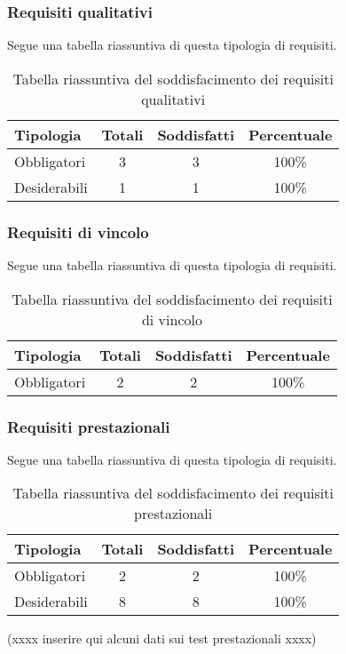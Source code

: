 \subsubsection{Requisiti qualitativi}
Segue una tabella riassuntiva di questa tipologia di requisiti.
\begin{table}[H]
	\begin{center}
	  \begin{tabular}{ l  c  c  c }
	    \hline
	    \textbf{Tipologia} & \textbf{Totali} & \textbf{Soddisfatti} & \textbf{Percentuale} \\ \hline
	    Obbligatori & 3 & 3 & 100\%\\ \hline
	    Desiderabili & 1 & 1 & 100\%\\
	    \hline
	  \end{tabular}
	\end{center}
	\caption{Tabella riassuntiva del soddisfacimento dei requisiti qualitativi}
\end{table}

\subsubsection{Requisiti di vincolo}
Segue una tabella riassuntiva di questa tipologia di requisiti.
\begin{table}[H]
	\begin{center}
	  \begin{tabular}{ l  c  c  c }
	    \hline
	    \textbf{Tipologia} & \textbf{Totali} & \textbf{Soddisfatti} & \textbf{Percentuale} \\ \hline
	    Obbligatori & 2 & 2 & 100\%\\
	    \hline
	  \end{tabular}
	\end{center}
\caption{Tabella riassuntiva del soddisfacimento dei requisiti di vincolo}
\end{table}	

\subsubsection{Requisiti prestazionali}
Segue una tabella riassuntiva di questa tipologia di requisiti.
\begin{table}[H]
	\begin{center}
	  \begin{tabular}{ l  c  c  c }
	    \hline
	    \textbf{Tipologia} & \textbf{Totali} & \textbf{Soddisfatti} & \textbf{Percentuale} \\ \hline
	    Obbligatori & 2 & 2 & 100\%\\ \hline
	    Desiderabili & 8 & 8 & 100\%\\
	    \hline
	  \end{tabular}
	\end{center}
\caption{Tabella riassuntiva del soddisfacimento dei requisiti prestazionali}
\end{table}	
(xxxx inserire qui alcuni dati sui test prestazionali xxxx)

